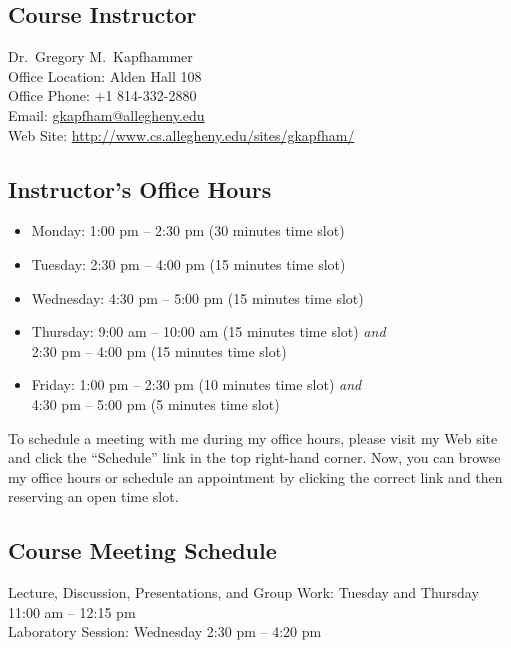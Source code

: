 



\subsection{Course Instructor}
Dr.\ Gregory M.\ Kapfhammer\\
\noindent Office Location: Alden Hall 108 \\
\noindent Office Phone: +1 814-332-2880 \\
\noindent Email: \url{gkapfham@allegheny.edu} \\
\noindent Web Site: \url{http://www.cs.allegheny.edu/sites/gkapfham/}

\subsection*{Instructor's Office Hours}

\begin{itemize}
	\itemsep 0em
	\item Monday: 1:00 pm -- 2:30 pm (30 minutes time slot)
	\item Tuesday: 2:30 pm -- 4:00 pm (15 minutes time slot)
	\item Wednesday: 4:30 pm -- 5:00 pm (15 minutes time slot)
	\item Thursday: 9:00 am -- 10:00 am (15 minutes time slot) {\em and} \\ \hspace*{.69in} 2:30 pm -- 4:00 pm (15 minutes time slot)
	\item Friday: 1:00 pm -- 2:30 pm (10 minutes time slot) {\em and} \\ \hspace*{.49in} 4:30 pm -- 5:00 pm (5 minutes time slot)
\end{itemize}

\noindent
To schedule a meeting with me during my office hours, please visit my Web site and click the ``Schedule'' link in the
top right-hand corner. Now, you can browse my office hours or schedule an appointment by clicking the correct link and
then reserving an open time slot. 

\subsection*{Course Meeting Schedule}

Lecture, Discussion, Presentations, and Group Work: Tuesday and Thursday 11:00 am -- 12:15 pm \\
Laboratory Session: Wednesday 2:30 pm -- 4:20 pm

